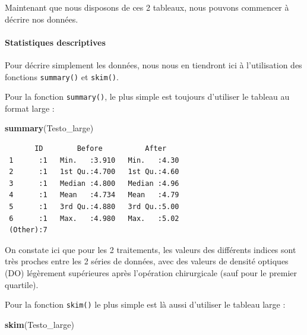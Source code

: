\documentclass[
  a4paper,
]{article}
\newenvironment{Shaded}{\begin{snugshade}}{\end{snugshade}}
\newcommand{\KeywordTok}[1]{\textcolor[rgb]{0.12,0.11,0.11}{\textbf{#1}}}
\newcommand{\NormalTok}[1]{\textcolor[rgb]{0.12,0.11,0.11}{#1}}
\begin{document}
Maintenant que nous disposons de ces 2 tableaux, nous pouvons commencer à décrire nos données.

\hypertarget{statistiques-descriptives-1}{%
\paragraph{Statistiques descriptives}\label{statistiques-descriptives-1}}

Pour décrire simplement les données, nous nous en tiendront ici à l'utilisation des fonctions \texttt{summary()} et \texttt{skim()}.

Pour la fonction \texttt{summary()}, le plus simple est toujours d'utiliser le tableau au format large :

\begin{Shaded}
\begin{Highlighting}[]
\KeywordTok{summary}\NormalTok{(Testo_large)}
\end{Highlighting}
\end{Shaded}

\begin{verbatim}
       ID        Before          After     
 1      :1   Min.   :3.910   Min.   :4.30  
 2      :1   1st Qu.:4.700   1st Qu.:4.60  
 3      :1   Median :4.800   Median :4.96  
 4      :1   Mean   :4.734   Mean   :4.79  
 5      :1   3rd Qu.:4.880   3rd Qu.:5.00  
 6      :1   Max.   :4.980   Max.   :5.02  
 (Other):7                                 
\end{verbatim}

On constate ici que pour les 2 traitements, les valeurs des différents indices sont très proches entre les 2 séries de données, avec des valeurs de densité optiques (DO) légèrement supérieures après l'opération chirurgicale (sauf pour le premier quartile).

Pour la fonction \texttt{skim()} le plus simple est là aussi d'utiliser le tableau large :

\begin{Shaded}
\begin{Highlighting}[]
\KeywordTok{skim}\NormalTok{(Testo_large)}
\end{Highlighting}
\end{Shaded}
\end{document}
